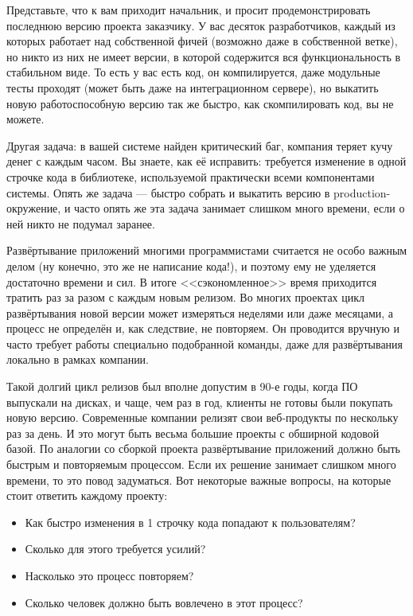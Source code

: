\documentclass{../../text-style}
\begin{document}
\maketitle
\thispagestyle{empty}


Представьте, что к вам приходит начальник, и просит продемонстрировать последнюю версию проекта заказчику. У вас десяток разработчиков, каждый из которых работает над собственной фичей (возможно даже в собственной ветке), но никто из них не имеет версии, в которой содержится вся функциональность в стабильном виде. То есть у вас есть код, он компилируется, даже модульные тесты проходят (может быть даже на интеграционном сервере), но выкатить новую работоспособную версию так же быстро, как скомпилировать код, вы не можете.

Другая задача: в вашей системе найден критический баг, компания теряет кучу денег с каждым часом. Вы знаете, как её исправить: требуется изменение в одной строчке кода в библиотеке, используемой практически всеми компонентами системы. Опять же задача --- быстро собрать и выкатить версию в production-окружение, и часто опять же эта задача занимает слишком много времени, если о ней никто не подумал заранее.

Развёртывание приложений многими программистами считается не особо важным делом (ну конечно, это же не написание кода!), и поэтому ему не уделяется достаточно времени и сил. В итоге <<сэкономленное>> время приходится тратить раз за разом с каждым новым релизом. Во многих проектах цикл развёртывания новой версии может измеряться неделями или даже месяцами, а процесс не определён и, как следствие, не повторяем. Он проводится вручную и часто требует работы специально подобранной команды, даже для развёртывания локально в рамках компании. 

Такой долгий цикл релизов был вполне допустим в 90-е годы, когда ПО выпускали на дисках, и чаще, чем раз в год, клиенты не готовы были покупать новую версию. Современные компании релизят свои веб-продукты по нескольку раз за день. И это могут быть весьма большие проекты с обширной кодовой базой. По аналогии со сборкой проекта развёртывание приложений должно быть быстрым и повторяемым процессом. Если их решение занимает слишком много времени, то это повод задуматься. Вот некоторые важные вопросы, на которые стоит ответить каждому проекту: 

\begin{itemize}
    \item Как быстро изменения в 1 строчку кода попадают к пользователям?
    \item Сколько для этого требуется усилий?
    \item Насколько это процесс повторяем?
    \item Сколько человек должно быть вовлечено в этот процесс?
\end{itemize}
\end{document}
